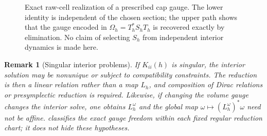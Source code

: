\documentclass[11pt,a4paper]{article}
\newtheorem{remark}[theorem]{Remark}
\begin{document}
\begin{figure}[t]
\centering
{}
\caption{Exact raw-cell realization of a prescribed cap gauge.  The lower
identity is independent of the chosen section; the upper path shows that
the gauge encoded in \(\Omega_h=T_h^*S_hT_h\) is recovered exactly by
elimination.  No claim of selecting \(S_h\) from independent interior
dynamics is made here.}
\label{fig:dynamic-condensation}
\end{figure}

\begin{remark}[Singular interior problems]
If \(K_{ii}(h)\) is singular, the interior solution may be nonunique or
subject to compatibility constraints.  The reduction is then a linear
relation rather than a map \(L_h\), and composition of Dirac relations or
presymplectic reduction is required.  Likewise, if changing the volume
gauge changes the interior solve, one obtains \(L_h^\omega\) and the
global map \(\omega\mapsto(L_h^\omega)^*\omega\) need not be affine.
 classifies the exact gauge freedom within
each fixed regular reduction chart; it does not hide these hypotheses.
\end{remark}
\end{document}
